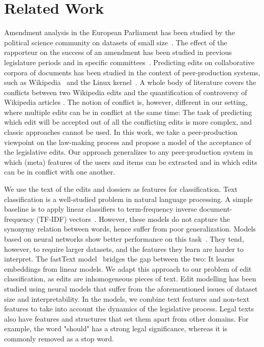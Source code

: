 \section{Related Work}
\label{sec:relwork}

Amendment analysis in the European Parliament has been studied by the political science community on datasets of small size~\cite{kreppel1999affects,tsebelis2001legislative,kreppel2002moving,baller2017specialists}.
The effect of the rapporteur on the success of an amendment has been studied in previous legislature periods and in specific committees~\cite{finke2012proposal,hurka2013changing}.
Predicting edits on collaborative corpora of documents has been studied in the context of peer-production systems, such as Wikipedia~\cite{druck2008learning,adler2007content,sarkar2019stre} and the Linux kernel~\cite{jiang2013will,yardim2018can}.
A whole body of literature covers the conflicts between two Wikipedia edits \cite{sumi2011edit,yasseri2012dynamics} and the quantification of controversy of Wikipedia articles \cite{sepehri2012leveraging,rad2012identifying}.
The notion of conflict is, however, different in our setting, where multiple edits can be in conflict at the same time:
The task of predicting which edit will be accepted out of all the conflicting edits is more complex, and classic approaches cannot be used.
In this work, we take a peer-production viewpoint on the law-making process and propose a model of the acceptance of the legislative edits.
Our approach generalizes to any peer-production system in which (meta) features of the users and items can be extracted and in which edits can be in conflict with one another.

We use the text of the edits and dossiers as features for classification.
Text classification is a well-studied problem in natural language processing.
A simple baseline is to apply linear classifiers to term-frequency inverse document-frequency (TF-IDF) vectors~\cite{joachims1998text}.
However, these models do not capture the synonymy relation between words, hence suffer from poor generalization.
Models based on neural networks show better performance on this task~\cite{zhang2015character}.
They tend, however, to require larger datasets, and the features they learn are harder to interpret.
The fastText model~\cite{joulin2017bag} bridges the gap between the two:
It learns embeddings from linear models.
We adapt this approach to our problem of edit classification, as edits are inhomogeneous pieces of text.
Edit modelling has been studied using neural models\cite{yin2018learning,guu2018generating} that suffer from the aforementioned issues of dataset size and interpretability.
In the \warofwords{} models, we combine text features and non-text features to take into account the dynamics of the legislative process.
Legal texts also have features and structures that set them apart from other domains.
For example, the word "should" has a strong legal significance, whereas it is commonly removed as a stop word.

